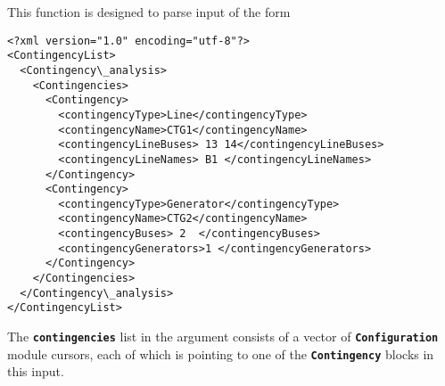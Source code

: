 This function is designed to parse input of the form

{
\color{blue}
\begin{Verbatim}[fontseries=b]
<?xml version="1.0" encoding="utf-8"?>
<ContingencyList>
  <Contingency\_analysis>
    <Contingencies>
      <Contingency>
        <contingencyType>Line</contingencyType>
        <contingencyName>CTG1</contingencyName>
        <contingencyLineBuses> 13 14</contingencyLineBuses>
        <contingencyLineNames> B1 </contingencyLineNames>
      </Contingency>
      <Contingency>
        <contingencyType>Generator</contingencyType>
        <contingencyName>CTG2</contingencyName>
        <contingencyBuses> 2  </contingencyBuses>
        <contingencyGenerators>1 </contingencyGenerators>
      </Contingency>
    </Contingencies>
  </Contingency\_analysis>
</ContingencyList>
\end{Verbatim}
}

The \texttt{\textbf{contingencies}} list in the argument consists of a vector of \texttt{\textbf{Configuration}} module cursors, each of which is pointing to one of the \texttt{\textbf{Contingency}} blocks in this input.

